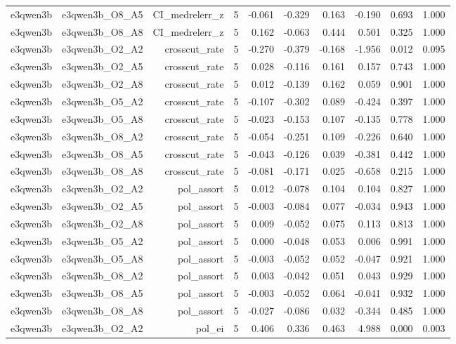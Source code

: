 \documentclass[11pt]{article}
\begin{document}
\begin{landscape}
\begin{longtable}{@{}lrrrrrrrrr@{}}
e3qwen3b & e3qwen3b\_O8\_A5 & CI\_medrelerr\_z & 5 & -0.061 & -0.329 & 0.163 & -0.190 & 0.693 & 1.000 \\
e3qwen3b & e3qwen3b\_O8\_A8 & CI\_medrelerr\_z & 5 & 0.162 & -0.063 & 0.444 & 0.501 & 0.325 & 1.000 \\
e3qwen3b & e3qwen3b\_O2\_A2 & crosscut\_rate & 5 & -0.270 & -0.379 & -0.168 & -1.956 & 0.012 & 0.095 \\
e3qwen3b & e3qwen3b\_O2\_A5 & crosscut\_rate & 5 & 0.028 & -0.116 & 0.161 & 0.157 & 0.743 & 1.000 \\
e3qwen3b & e3qwen3b\_O2\_A8 & crosscut\_rate & 5 & 0.012 & -0.139 & 0.162 & 0.059 & 0.901 & 1.000 \\
e3qwen3b & e3qwen3b\_O5\_A2 & crosscut\_rate & 5 & -0.107 & -0.302 & 0.089 & -0.424 & 0.397 & 1.000 \\
e3qwen3b & e3qwen3b\_O5\_A8 & crosscut\_rate & 5 & -0.023 & -0.153 & 0.107 & -0.135 & 0.778 & 1.000 \\
e3qwen3b & e3qwen3b\_O8\_A2 & crosscut\_rate & 5 & -0.054 & -0.251 & 0.109 & -0.226 & 0.640 & 1.000 \\
e3qwen3b & e3qwen3b\_O8\_A5 & crosscut\_rate & 5 & -0.043 & -0.126 & 0.039 & -0.381 & 0.442 & 1.000 \\
e3qwen3b & e3qwen3b\_O8\_A8 & crosscut\_rate & 5 & -0.081 & -0.171 & 0.025 & -0.658 & 0.215 & 1.000 \\
e3qwen3b & e3qwen3b\_O2\_A2 & pol\_assort & 5 & 0.012 & -0.078 & 0.104 & 0.104 & 0.827 & 1.000 \\
e3qwen3b & e3qwen3b\_O2\_A5 & pol\_assort & 5 & -0.003 & -0.084 & 0.077 & -0.034 & 0.943 & 1.000 \\
e3qwen3b & e3qwen3b\_O2\_A8 & pol\_assort & 5 & 0.009 & -0.052 & 0.075 & 0.113 & 0.813 & 1.000 \\
e3qwen3b & e3qwen3b\_O5\_A2 & pol\_assort & 5 & 0.000 & -0.048 & 0.053 & 0.006 & 0.991 & 1.000 \\
e3qwen3b & e3qwen3b\_O5\_A8 & pol\_assort & 5 & -0.003 & -0.052 & 0.052 & -0.047 & 0.921 & 1.000 \\
e3qwen3b & e3qwen3b\_O8\_A2 & pol\_assort & 5 & 0.003 & -0.042 & 0.051 & 0.043 & 0.929 & 1.000 \\
e3qwen3b & e3qwen3b\_O8\_A5 & pol\_assort & 5 & -0.003 & -0.052 & 0.064 & -0.041 & 0.932 & 1.000 \\
e3qwen3b & e3qwen3b\_O8\_A8 & pol\_assort & 5 & -0.027 & -0.086 & 0.032 & -0.344 & 0.485 & 1.000 \\
e3qwen3b & e3qwen3b\_O2\_A2 & pol\_ei & 5 & 0.406 & 0.336 & 0.463 & 4.988 & 0.000 & 0.003 \\

\end{longtable}
\end{landscape}
\end{document}
